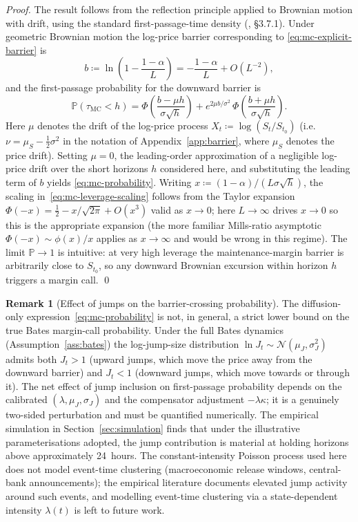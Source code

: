 \documentclass[preprint,12pt,authoryear]{elsarticle}
\newcommand{\PP}{\mathbb{P}}
\theoremstyle{definition}
\newtheorem{remark}{Remark}[section]
\begin{document}
\begin{proof}
The result follows from the reflection principle applied to Brownian
motion with drift, using the standard first-passage-time density
(\citealp{Shreve2004}, \S3.7.1). Under geometric Brownian
motion the log-price barrier corresponding to
\eqref{eq:mc-explicit-barrier} is
\[
    b \coloneqq \ln\!\left( 1 - \frac{1 - \alpha}{L} \right)
    = -\frac{1 - \alpha}{L} + O(L^{-2}),
\]
and the first-passage probability for the downward barrier is
\[
    \PP(\tau_{\text{MC}} < h)
    = \Phi\!\left( \frac{b - \mu h}{\sigma \sqrt{h}} \right)
      + e^{2 \mu b / \sigma^{2}} \,
      \Phi\!\left( \frac{b + \mu h}{\sigma \sqrt{h}} \right).
\]
Here $\mu$ denotes the drift of the log-price process
$X_t \coloneqq \log(S_t/S_{t_0})$ (i.e.\ $\nu = \mu_S - \tfrac12 \sigma^{2}$
in the notation of Appendix~\ref{app:barrier}, where $\mu_S$
denotes the price drift). Setting $\mu = 0$,
the leading-order approximation of a negligible log-price
drift over the short horizons $h$ considered here, and
substituting the leading term of $b$ yields
\eqref{eq:mc-probability}. Writing
$x \coloneqq (1-\alpha)/(L\sigma\sqrt{h})$, the scaling
in~\eqref{eq:mc-leverage-scaling} follows from the Taylor
expansion $\Phi(-x) = \tfrac{1}{2} - x/\sqrt{2\pi} + O(x^3)$
valid as $x \to 0$; here $L \to \infty$ drives $x \to 0$ so this
is the appropriate expansion (the more familiar Mills-ratio
asymptotic $\Phi(-x) \sim \phi(x)/x$ applies as $x \to \infty$
and would be wrong in this regime).
The limit $\PP \to 1$ is intuitive: at very high leverage the
maintenance-margin barrier is arbitrarily close to $S_{t_0}$, so
any downward Brownian excursion within horizon $h$ triggers a
margin call. \qed
\end{proof}

\begin{remark}[Effect of jumps on the barrier-crossing probability]
\label{rem:jump-amplification}
The diffusion-only expression~\eqref{eq:mc-probability} is not,
in general, a strict lower bound on the true Bates margin-call
probability. Under the full Bates dynamics
(Assumption~\ref{ass:bates}) the log-jump-size distribution
$\ln J_t \sim \mathcal{N}(\mu_J, \sigma_J^2)$ admits both
$J_t > 1$ (upward jumps, which move the price away from the
downward barrier) and $J_t < 1$ (downward jumps, which move
towards or through it). The net effect of jump inclusion on
first-passage probability depends on the calibrated
$(\lambda, \mu_J, \sigma_J)$ and the compensator adjustment
$-\lambda\kappa$; it is a genuinely two-sided perturbation and
must be quantified numerically. The empirical simulation in
Section~\ref{sec:simulation} finds that under the illustrative
parameterisations adopted, the jump contribution is material at
holding horizons above approximately 24~hours. The
constant-intensity Poisson process used here does not model
event-time clustering (macroeconomic release windows,
central-bank announcements); the empirical literature documents
elevated jump activity around such events, and modelling
event-time clustering via a state-dependent intensity
$\lambda(t)$ is left to future work.
\end{remark}
\end{document}
